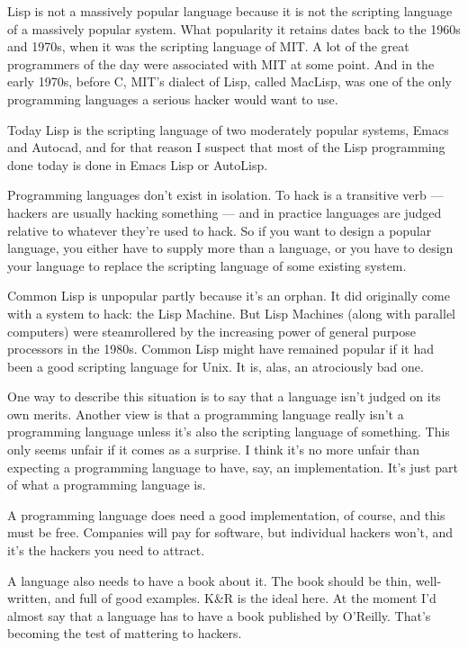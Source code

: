 Lisp is not a massively popular language because it is not the scripting
language of a massively popular system. What popularity it retains dates
back to the 1960s and 1970s, when it was the scripting language of MIT.
A lot of the great programmers of the day were associated with MIT at
some point. And in the early 1970s, before C, MIT's dialect of Lisp,
called MacLisp, was one of the only programming languages a serious
hacker would want to use.

Today Lisp is the scripting language of two moderately popular systems,
Emacs and Autocad, and for that reason I suspect that most of the Lisp
programming done today is done in Emacs Lisp or AutoLisp.

Programming languages don't exist in isolation. To hack is a transitive
verb --- hackers are usually hacking something --- and in practice
languages are judged relative to whatever they're used to hack. So if
you want to design a popular language, you either have to supply more
than a language, or you have to design your language to replace the
scripting language of some existing system.

Common Lisp is unpopular partly because it's an orphan. It did
originally come with a system to hack: the Lisp Machine. But Lisp
Machines (along with parallel computers) were steamrollered by the
increasing power of general purpose processors in the 1980s. Common Lisp
might have remained popular if it had been a good scripting language for
Unix. It is, alas, an atrociously bad one.

One way to describe this situation is to say that a language isn't
judged on its own merits. Another view is that a programming language
really isn't a programming language unless it's also the scripting
language of something. This only seems unfair if it comes as a surprise.
I think it's no more unfair than expecting a programming language to
have, say, an implementation. It's just part of what a programming
language is.

A programming language does need a good implementation, of course, and
this must be free. Companies will pay for software, but individual
hackers won't, and it's the hackers you need to attract.

A language also needs to have a book about it. The book should be thin,
well-written, and full of good examples. K\&R is the ideal here. At the
moment I'd almost say that a language has to have a book published by
O'Reilly. That's becoming the test of mattering to hackers.

